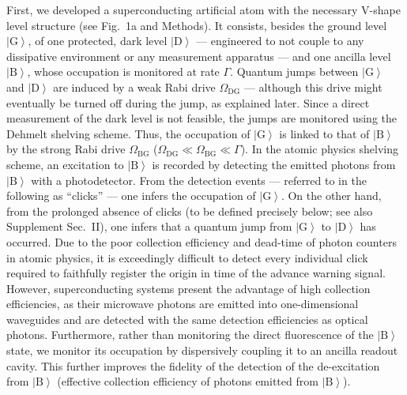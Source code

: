 \documentclass[
	 			preprint,     		superscriptaddress, 																longbibliography,
		amsmath, amssymb,
		aps,  prb,   		floatfix,
		linenumbers     
	]{revtex4-1}
\newcommand{\ket}[1]{\left|#1\right>}
\begin{document}
First, we developed a superconducting artificial atom with the necessary V-shape level structure (see Fig.~1a and Methods). It consists, besides the ground level $\ket{\mathrm G}$,  of one protected, dark level $\ket{\mathrm D}$ ---  engineered to not couple to any dissipative environment or any measurement apparatus 
 ---  and one ancilla level $\ket{\mathrm B}$, whose occupation is monitored at rate $\Gamma$.
Quantum jumps between $\left|\mathrm G\right>$ and $\left|\mathrm D\right>$ are induced by a weak Rabi drive $\Omega_{\mathrm{DG}}$ --- although this drive might eventually be turned off during the jump, as explained later.
Since a direct measurement of the dark level is not feasible, the jumps are monitored using the Dehmelt shelving scheme\cite{Nagourney1986}.
Thus, the occupation of $\left|\mathrm G\right>$  is linked to  that of $\left|\mathrm B\right>$ by the strong Rabi drive $\Omega_{\mathrm{BG}}$ ($ \Omega_{\mathrm{DG}} \ll \Omega_{\mathrm{BG}} \ll \Gamma $). 
In the atomic physics shelving scheme\cite{Nagourney1986, Sauter1986, Bergquist1986}, an excitation to $\ket{\mathrm{B}}$ is recorded by detecting the emitted photons from $\ket{\mathrm{B}}$ with a photodetector. From the detection events --- referred to in the following as ``clicks'' --- one infers the occupation of  $\ket{\mathrm{G}}$. On the other hand, from the prolonged absence of clicks (to be defined precisely below; see also Supplement Sec.~II), one infers that a quantum jump from $\ket{\mathrm{G}}$ to $\ket{\mathrm{D}}$ has occurred.
Due to the poor collection efficiency and dead-time of photon counters in atomic physics\cite{Volz2011}, it is exceedingly difficult to detect every individual click required to faithfully register the origin in time of the advance warning signal.
However, superconducting systems present the advantage of high collection efficiencies\cite{Riste2013, Murch2013, Weber2014}, as  their microwave photons are emitted into one-dimensional waveguides  and are detected with the same detection efficiencies as optical photons.
Furthermore, rather than monitoring the direct fluorescence of the $\ket{\mathrm{B}}$ state, we monitor its occupation by dispersively coupling it to an ancilla readout cavity. 
This further improves the fidelity of the detection of the  de-excitation from $\ket{\mathrm{B}}$ (effective collection  efficiency of  photons emitted from $\ket{\mathrm{B}}$).
\end{document}
